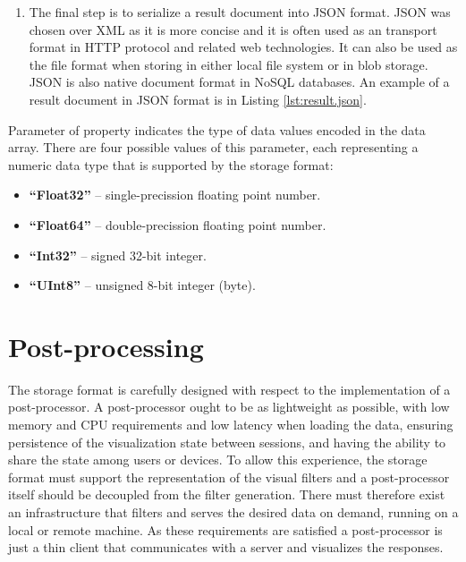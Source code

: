 \begin{enumerate}
    \item The final step is to serialize a result document into JSON format. JSON was chosen over XML as it is more concise and it is often used as an transport format in HTTP protocol and related web technologies. It can also be used as the file format when storing in either local file system or in blob storage. JSON is also native document format in NoSQL databases. An example of a result document in JSON format is in Listing \ref{lst:result.json}.

\end{enumerate}

Parameter  of  property indicates the type of data values encoded in the data array. There are four possible values of this parameter, each representing a numeric data type that is supported by the storage format:

\begin{itemize}
    \item \textbf{``Float32''} -- single-precission floating point number.
    \item \textbf{``Float64''} -- double-precission floating point number.
    \item \textbf{``Int32''} -- signed 32-bit integer.
    \item \textbf{``UInt8''} -- unsigned 8-bit integer (byte).
\end{itemize}

\section{Post-processing}
\label{sec:postprocessing}

The storage format is carefully designed with respect to the implementation of a post-processor. A post-processor ought to be as lightweight as possible, with low memory and CPU requirements and low latency when loading the data, ensuring persistence of the visualization state between sessions, and having the ability to share the state among users or devices. To allow this experience, the storage format must support the representation of the visual filters and a post-processor itself should be decoupled from the filter generation. There must therefore exist an infrastructure that filters and serves the desired data on demand, running on a local or remote machine. As these requirements are satisfied a post-processor is just a thin client that communicates with a server and visualizes the responses.

